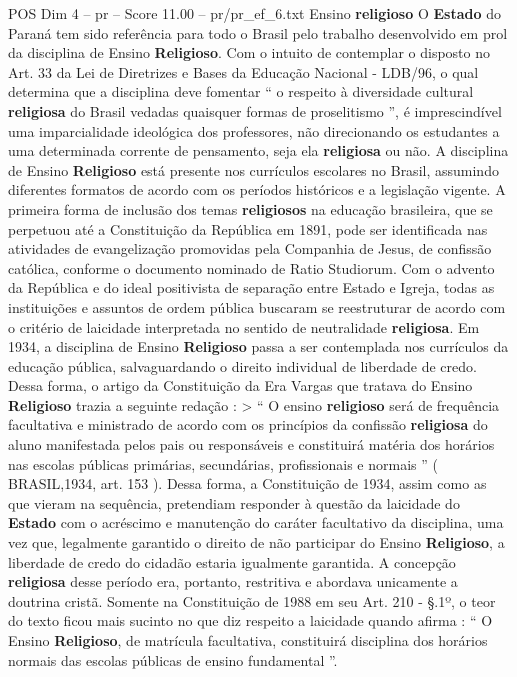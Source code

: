 \begin{textsample}{POS Dim 4 – pr – Score 11.00 – pr/pr\_ef\_6.txt}  \label{ex:f4_pos_185}
Ensino \textbf{religioso} O \textbf{Estado} do Paraná tem sido referência para todo o Brasil pelo trabalho desenvolvido em prol da disciplina de Ensino \textbf{Religioso}.
Com o intuito de contemplar o disposto no Art. 33 da Lei de Diretrizes e Bases da Educação Nacional - LDB/96, o qual determina que a disciplina deve fomentar “ o respeito à diversidade cultural \textbf{religiosa} do Brasil vedadas quaisquer formas de proselitismo ”, é imprescindível uma imparcialidade ideológica dos professores, não direcionando os estudantes a uma determinada corrente de pensamento, seja ela \textbf{religiosa} ou não.
A disciplina de Ensino \textbf{Religioso} está presente nos currículos escolares no Brasil, assumindo diferentes formatos de acordo com os períodos históricos e a legislação vigente.
A primeira forma de inclusão dos temas \textbf{religiosos} na educação brasileira, que se perpetuou até a Constituição da República em 1891, pode ser identificada nas atividades de evangelização promovidas pela Companhia de Jesus, de confissão católica, conforme o documento nominado de Ratio Studiorum.
Com o advento da República e do ideal positivista de separação entre Estado e Igreja, todas as instituições e assuntos de ordem pública buscaram se reestruturar de acordo com o critério de laicidade interpretada no sentido de neutralidade \textbf{religiosa}.
Em 1934, a disciplina de Ensino \textbf{Religioso} passa a ser contemplada nos currículos da educação pública, salvaguardando o direito individual de liberdade de credo.
Dessa forma, o artigo da Constituição da Era Vargas que tratava do Ensino \textbf{Religioso} trazia a seguinte redação : > “ O ensino \textbf{religioso} será de frequência facultativa e ministrado de acordo com os princípios da confissão \textbf{religiosa} do aluno manifestada pelos pais ou responsáveis e constituirá matéria dos horários nas escolas públicas primárias, secundárias, profissionais e normais ” ( BRASIL,1934, art. 153 ).
Dessa forma, a Constituição de 1934, assim como as que vieram na sequência, pretendiam responder à questão da laicidade do \textbf{Estado} com o acréscimo e manutenção do caráter facultativo da disciplina, uma vez que, legalmente garantido o direito de não participar do Ensino \textbf{Religioso}, a liberdade de credo do cidadão estaria igualmente garantida.
A concepção \textbf{religiosa} desse período era, portanto, restritiva e abordava unicamente a doutrina cristã.
Somente na Constituição de 1988 em seu Art. 210 - §.1º, o teor do texto ficou mais sucinto no que diz respeito a laicidade quando afirma : “ O Ensino \textbf{Religioso}, de matrícula facultativa, constituirá disciplina dos horários normais das escolas públicas de ensino fundamental ”.

\end{textsample}
